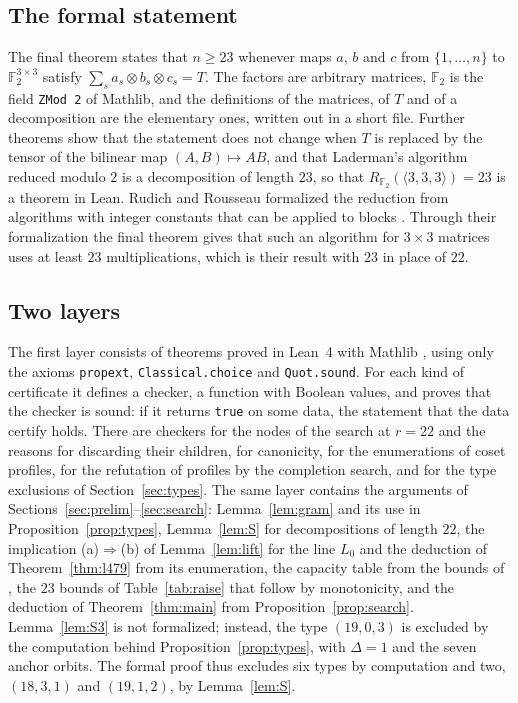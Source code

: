 \documentclass[11pt]{amsart}
\theoremstyle{definition}
\theoremstyle{remark}
\numberwithin{equation}{section}
\newcommand{\F}{\mathbb{F}_2}
\newcommand{\mm}{\langle 3,3,3\rangle}
\begin{document}
\subsection{The formal statement}
The final theorem states that $n\ge 23$ whenever maps $a$, $b$ and $c$ from $\{1,\dots,n\}$ to $\F^{3\times 3}$ satisfy $\sum_s a_s\otimes b_s\otimes c_s=T$. The factors are arbitrary matrices, $\F$ is the field \texttt{ZMod 2} of Mathlib, and the definitions of the matrices, of $T$ and of a decomposition are the elementary ones, written out in a short file. Further theorems show that the statement does not change when $T$ is replaced by the tensor of the bilinear map $(A,B)\mapsto AB$, and that Laderman's algorithm reduced modulo $2$ is a decomposition of length $23$, so that $R_{\F}(\mm)=23$ is a theorem in Lean. Rudich and Rousseau formalized the reduction from algorithms with integer constants that can be applied to blocks \cite{RR26}. Through their formalization the final theorem gives that such an algorithm for $3\times 3$ matrices uses at least $23$ multiplications, which is their result with $23$ in place of $22$.

\subsection{Two layers}
The first layer consists of theorems proved in Lean~4 \cite{dMU21} with Mathlib \cite{mC20}, using only the axioms \texttt{propext}, \texttt{Classical.choice} and \texttt{Quot.sound}. For each kind of certificate it defines a checker, a function with Boolean values, and proves that the checker is sound: if it returns \texttt{true} on some data, the statement that the data certify holds. There are checkers for the nodes of the search at $r=22$ and the reasons for discarding their children, for canonicity, for the enumerations of coset profiles, for the refutation of profiles by the completion search, and for the type exclusions of Section~\ref{sec:types}. The same layer contains the arguments of Sections~\ref{sec:prelim}--\ref{sec:search}: Lemma~\ref{lem:gram} and its use in Proposition~\ref{prop:types}, Lemma~\ref{lem:S} for decompositions of length $22$, the implication (a)$\Rightarrow$(b) of Lemma~\ref{lem:lift} for the line $L_0$ and the deduction of Theorem~\ref{thm:l479} from its enumeration, the capacity table from the bounds of \cite{RR26}, the $23$ bounds of Table~\ref{tab:raise} that follow by monotonicity, and the deduction of Theorem~\ref{thm:main} from Proposition~\ref{prop:search}. Lemma~\ref{lem:S3} is not formalized; instead, the type $(19,0,3)$ is excluded by the computation behind Proposition~\ref{prop:types}, with $\Delta=1$ and the seven anchor orbits. The formal proof thus excludes six types by computation and two, $(18,3,1)$ and $(19,1,2)$, by Lemma~\ref{lem:S}.
\end{document}
